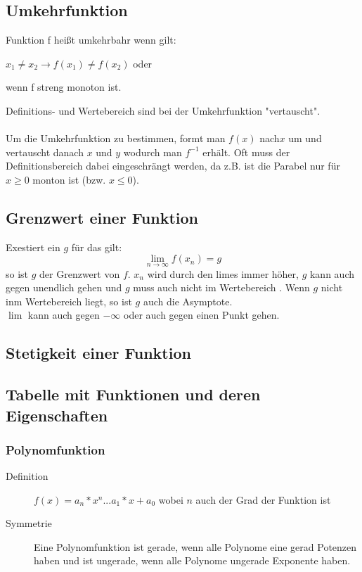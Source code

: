 \documentclass[a4paper]{scrartcl}
\begin{document}
    \subsection{Umkehrfunktion}
    Funktion f heißt umkehrbahr wenn gilt:     
    \begin{description}
        \item $x_1 \neq x_2 \rightarrow f(x_1) \neq f(x_2)$ oder
        \item wenn f streng monoton ist.
        \end{description}
    Definitions- und Wertebereich sind bei der Umkehrfunktion "vertauscht". \\  
    \\ Um die Umkehrfunktion zu bestimmen, formt man $f(x)$ nach$x$ um und vertauscht danach $x$ und $y$ wodurch man $f^{-1}$ erhält.
    Oft muss der Definitionsbereich dabei eingeschrängt werden, da z.B. ist die Parabel nur für $x \geq 0$ monton ist (bzw. $x \leq 0$). 

    \subsection{Grenzwert einer Funktion}
    Exestiert ein $g$ für das gilt:
    \begin{equation*}
        \lim \limits_{n \to \infty}f(x_n) = g
    \end{equation*} 
    so ist $g$ der Grenzwert von $f$.
    $x_n$ wird durch den limes immer höher, $g$ kann auch gegen unendlich gehen und $g$ muss auch nicht im Wertebereich . Wenn $g$ nicht inm Wertebereich liegt, so ist $g$ auch die Asymptote. \\
    $\lim$ kann auch gegen $-\infty$ oder auch gegen einen Punkt gehen.

    \subsection{Stetigkeit einer Funktion}

    \newpage
    \subsection{Tabelle mit Funktionen und deren Eigenschaften}
        \subsubsection{Polynomfunktion}        
        \begin{description}
            \item[Definition] $f(x) = a_n*x^n...a_1*x + a_0$ wobei $n$ auch der Grad der Funktion ist
            \item[Symmetrie] Eine Polynomfunktion ist gerade, wenn alle Polynome eine gerad Potenzen haben und ist ungerade, wenn alle Polynome ungerade Exponente haben.
        \end{description}
\end{document}
